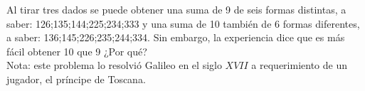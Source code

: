 \item Al tirar tres dados se puede obtener una suma de 9 de seis formas distintas, a saber: 126;135;144;225;234;333 y una suma de 10 también de 6 formas diferentes, a saber: 136;145;226;235;244;334. Sin embargo, la experiencia dice que es más fácil obtener 10 que 9 ¿Por qué?\\
Nota: este problema lo resolvió Galileo en el siglo $XVII$ a requerimiento de un jugador, el príncipe de Toscana.